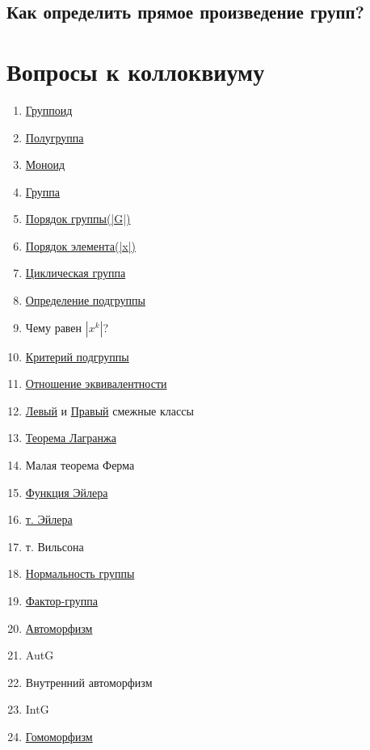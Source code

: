 \documentclass[12pt]{article}
\begin{document}
	\subsection{Как определить прямое произведение групп?}



			
	\newpage
		\section{Вопросы к коллоквиуму}
				\begin{enumerate}
					\item \hyperlink{indef:gruppoid}{Группоид}
					\item \hyperlink{indef:halfgroup}{Полугруппа}
					\item \hyperlink{indef:monoid}{Моноид}
					\item \hyperlink{indef:group}{Группа}
					\item \hyperlink{indef:por_group}{Порядок группы(|G|)}
					\item \hyperlink{indef:kpor_el}{Порядок элемента(|x|)}
					\item \hyperlink{indef:circle_group}{Циклическая группа}
					\item \hyperlink{indef_subgroup}{Определение подгруппы}
					\item Чему равен $|x^k|$? 
					\item \hyperlink{th_subgroup_cri}{Критерий подгруппы}
					\item \hyperlink{indef:equiv}{Отношение эквивалентности}
					\item \hyperlink{indef:left_class}{Левый} и \hyperlink{indef:right_class}{Правый} смежные классы 
					\item \hyperlink{t_lang}{Теорема Лагранжа}
					\item Малая теорема Ферма
					\item \hyperlink{el}{Функция Эйлера}
					\item \hyperlink{el}{т. Эйлера} 
					\item т. Вильсона
					\item \hyperlink{indef:norm_gr}{Нормальность группы} 
					\item \hyperlink{indef:fact_gr}{Фактор-группа}
					\item \hyperlink{indef:morfizm}{Автоморфизм}
					\item AutG 
					\item Внутренний автоморфизм
					\item IntG
					\item \hyperlink{indef:morfizm}{Гомоморфизм}

\end{enumerate}
\end{document}
